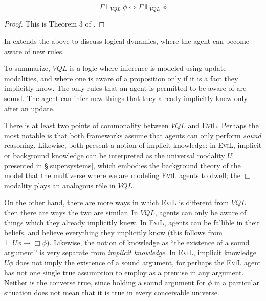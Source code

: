 \begin{theorem}
\[ \Gamma \vdash_{VQL} \phi \iff \Gamma \Vdash_{VQL} \phi \]
\end{theorem}
\begin{proof}
This is Theorem 3 of \cite{velzquez-quesada_inference_2009}.
\end{proof}

In \cite{velzquez-quesada_inference_2009} extends the above to 
discuss logical dynamics, where the agent can become aware of new rules.

To summarize, $VQL$ is a logic where inference is modeled using update
modalities, and where one is aware of a proposition only if it is a
fact they implicitly know.  The only rules that an agent is permitted to
be aware of are sound.  The agent can infer new things that they
already implicitly knew only after an update.

There is at least two points of commonality between $VQL$ and
\textsc{EviL}.  Perhaps the most notable is that both frameworks
assume that agents can only perform \emph{sound} reasoning.  Likewise,
both present a notion of implicit knowledge: in \textsc{EviL},
implicit or background knowledge can be interpreted as the 
universal modality $U$ presented in \S\ref{supersystems}, which embodies the background theory of the
model that the multiverse where we are modeling \textsc{EviL} agents
to dwell; the $\Box$ modality plays an analogous
r\^{o}le in $VQL$.

On the other hand, there are more ways in which \textsc{EviL} is different from $VQL$ then
there are ways the two are similar.  In $VQL$, agents can only be 
aware of things which they already implicitly
knew.  In \textsc{EviL}, agents can be fallible in their beliefs, and
believe everything they implicitly know 
(this follows from $\vdash U \phi \to \Box \phi$).
Likewise, the notion of knowledge as ``the existence of a sound
argument'' is very separate from \emph{implicit knowledge}.  In \textsc{EviL}, implicit knowledge $U\phi$ does not imply the existence of a sound
argument, for perhaps the \textsc{EviL} agent has not one single true
assumption to employ as a premise in any argument.  Neither is the
converse true, since holding a sound argument for $\phi$ in a
particular situation does not mean that it is true in every 
conceivable universe.

